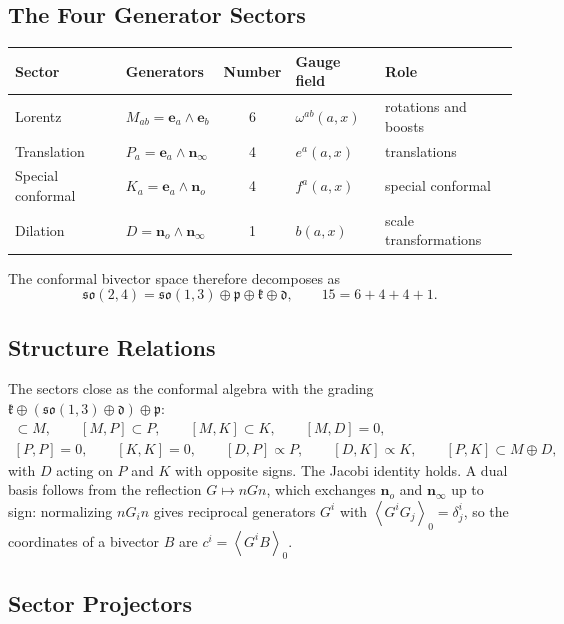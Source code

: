 \documentclass[11pt,a4paper]{article}
\newcommand{\so}{\mathfrak{so}}
\newcommand{\nzero}{\mathbf{n}_o}
\newcommand{\ninf}{\mathbf{n}_\infty}
\newcommand{\e}{\mathbf{e}}
\newcommand{\wedgeprod}{\mathbin{\wedge}}
\newcommand{\grade}[2]{\left\langle #1\right\rangle_{#2}}
\begin{document}
\subsection{The Four Generator Sectors}

\begin{center}
\begin{tabular}{llcll}
    \toprule
    Sector & Generators & Number & Gauge field & Role\\
    \midrule
    Lorentz & \(M_{ab}=\e_a\wedgeprod\e_b\) & 6 & \(\omega^{ab}(a,x)\)
        & rotations and boosts\\
    Translation & \(P_a=\e_a\wedgeprod\ninf\) & 4 & \(e^a(a,x)\)
        & translations\\
    Special conformal & \(K_a=\e_a\wedgeprod\nzero\) & 4 & \(f^a(a,x)\)
        & special conformal\\
    Dilation & \(D=\nzero\wedgeprod\ninf\) & 1 & \(b(a,x)\)
        & scale transformations\\
    \bottomrule
\end{tabular}
\end{center}

The conformal bivector space therefore decomposes as
\[
    \so(2,4)
    =
    \so(1,3)\oplus\mathfrak{p}\oplus\mathfrak{k}\oplus\mathfrak{d},
    \qquad
    15=6+4+4+1.
\]

\subsection{Structure Relations}

The sectors close as the conformal algebra with the grading
\(\mathfrak{k}\oplus(\so(1,3)\oplus\mathfrak{d})\oplus\mathfrak{p}\):
\begin{gather*}
    [M,M]\subset M,\qquad
    [M,P]\subset P,\qquad
    [M,K]\subset K,\qquad
    [M,D]=0,\\
    [P,P]=0,\qquad
    [K,K]=0,\qquad
    [D,P]\propto P,\qquad
    [D,K]\propto K,\qquad
    [P,K]\subset M\oplus D,
\end{gather*}
with \(D\) acting on \(P\) and \(K\) with opposite signs. The Jacobi
identity holds. A dual basis follows from the reflection
\(G\mapsto nGn\), which exchanges \(\nzero\) and \(\ninf\) up to sign:
normalizing \(nG_in\) gives reciprocal generators \(G^i\) with
\(\grade{G^iG_j}{0}=\delta^i_j\), so the coordinates of a bivector
\(B\) are \(c^i=\grade{G^iB}{0}\).

\subsection{Sector Projectors}
\end{document}

